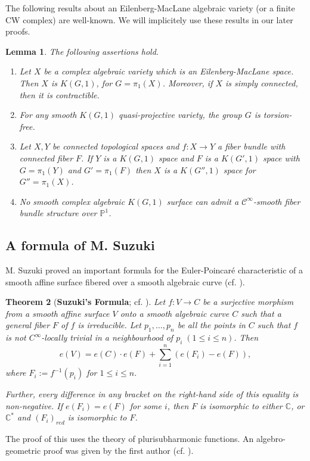 \documentclass[12pt,reqno,twoside]{amsart}
\newtheorem{theorem}{Theorem}[section]
\newtheorem{lemma}[theorem]{Lemma}
\theoremstyle{definition}
\numberwithin{equation}{section}
\newcommand{\C}{\mathbb{C}}
\newcommand{\PP}{\mathbb{P}}
\begin{document}
The following results about an Eilenberg-MacLane algebraic variety (or a finite CW complex) are well-known. We will implicitely use these results in our later proofs.
\begin{lemma}\label{Lem: Well-known about EM}
	The following assertions hold.
	
	\begin{enumerate}[\indent\rm(1)]
		\item Let $X$ be a complex algebraic variety which is an Eilenberg-MacLane space. Then $X$ is $K(G,1)$, for $G=\pi_1(X)$. Moreover, if $X$ is simply connected, then it is contractible.
		
		\item For any smooth $K(G,1)$ quasi-projective variety, the group $G$ is torsion-free.
		
		\item Let $X, Y$ be connected topological spaces and $f: X \to Y$ a fiber bundle with connected fiber $F$. If $Y$ is a $K(G,1)$ space and $F$ is a $K(G',1)$ space with $G=\pi_1(Y)$ and $G'=\pi_1(F)$ then $X$ is a $K(G'',1)$ space for $G''=\pi_1(X)$.
		
		\item No smooth complex algebraic $K(G,1)$ surface can admit a $\mathscr{C}^\infty$-smooth fiber bundle structure over $\PP^1$.	
	\end{enumerate}
\end{lemma}

\subsection{A formula of M. Suzuki}
M. Suzuki proved an important formula for the Euler-Poincar{\'e} characteristic of a smooth affine surface fibered over a smooth algebraic curve (cf. \cite{Suz1977}).
\begin{theorem}[{{\bf Suzuki's Formula}; cf. \cite{Suz1977}}]\label{Suzuki's formula}
	Let $f:V\to C$ be a surjective morphism from a smooth affine surface $V$ onto a smooth algebraic curve $C$ such that a general fiber $F$ of $f$ is irreducible. Let $p_1,\ldots,p_n$ be all the points in $C$ such that $f$ is not $C^{\infty}$-locally trivial in a neighbourhood of $p_i\;(1\leq i \leq n)$. Then
	$$e(V)=e(C)\cdot e(F) + \sum\limits_{i=1}^{n}\left(e(F_i)-e(F)\right),$$ where $F_i:=f^{-1}(p_i)$ for $1\leq i \leq n$. 
	
	Further, every difference in any bracket on the right-hand side of this equality is non-negative. If $e(F_i)=e(F)$ for some $i$, then $F$ is isomorphic to either $\C$, or $\C^*$ and $(F_i)_{red}$ is isomorphic to $F$.
\end{theorem}
The proof of this uses the theory of plurisubharmonic functions. An algebro-geometric proof was given by the first author (cf. \cite{Gur1997}).
\end{document}
